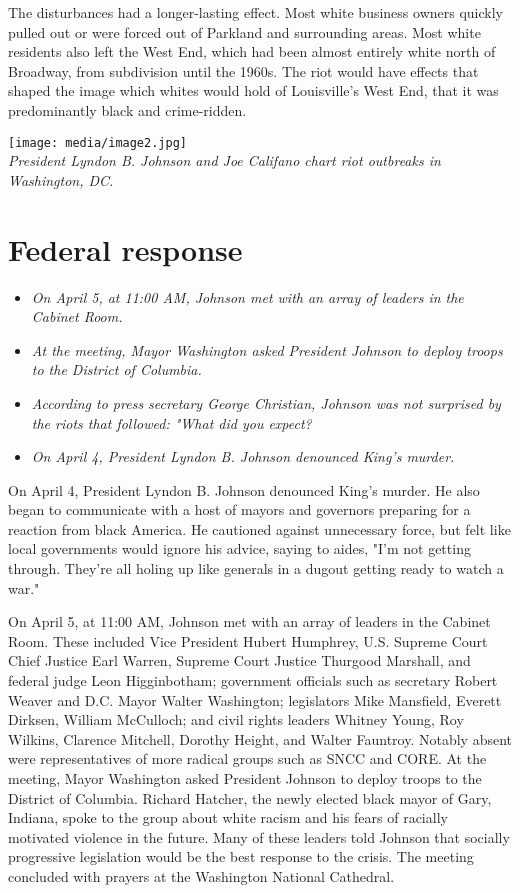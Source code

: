 The disturbances had a longer-lasting effect. Most white business owners
quickly pulled out or were forced out of Parkland and surrounding areas.
Most white residents also left the West End, which had been almost
entirely white north of Broadway, from subdivision until the 1960s. The
riot would have effects that shaped the image which whites would hold of
Louisville's West End, that it was predominantly black and crime-ridden.

\texttt{[image: media/image2.jpg]}\\
\emph{President Lyndon B. Johnson and Joe Califano chart riot outbreaks
in Washington, DC.}

\section{Federal response}\label{federal-response}

\begin{itemize}
\item
  \emph{On April 5, at 11:00 AM, Johnson met with an array of leaders in
  the Cabinet Room.}
\item
  \emph{At the meeting, Mayor Washington asked President Johnson to
  deploy troops to the District of Columbia.}
\item
  \emph{According to press secretary George Christian, Johnson was not
  surprised by the riots that followed: "What did you expect?}
\item
  \emph{On April 4, President Lyndon B. Johnson denounced King's
  murder.}
\end{itemize}

On April 4, President Lyndon B. Johnson denounced King's murder. He also
began to communicate with a host of mayors and governors preparing for a
reaction from black America. He cautioned against unnecessary force, but
felt like local governments would ignore his advice, saying to aides,
"I'm not getting through. They're all holing up like generals in a
dugout getting ready to watch a war."

On April 5, at 11:00 AM, Johnson met with an array of leaders in the
Cabinet Room. These included Vice President Hubert Humphrey, U.S.
Supreme Court Chief Justice Earl Warren, Supreme Court Justice Thurgood
Marshall, and federal judge Leon Higginbotham; government officials such
as secretary Robert Weaver and D.C. Mayor Walter Washington; legislators
Mike Mansfield, Everett Dirksen, William McCulloch; and civil rights
leaders Whitney Young, Roy Wilkins, Clarence Mitchell, Dorothy Height,
and Walter Fauntroy. Notably absent were representatives of more radical
groups such as SNCC and CORE. At the meeting, Mayor Washington asked
President Johnson to deploy troops to the District of Columbia. Richard
Hatcher, the newly elected black mayor of Gary, Indiana, spoke to the
group about white racism and his fears of racially motivated violence in
the future. Many of these leaders told Johnson that socially progressive
legislation would be the best response to the crisis. The meeting
concluded with prayers at the Washington National Cathedral.

